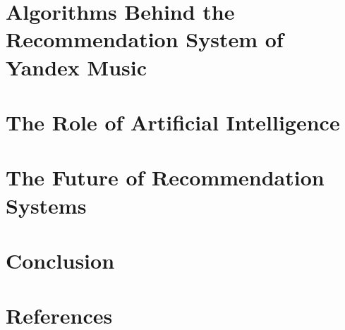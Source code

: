 \documentclass[12pt,a4paper]{article}
\begin{document}
\section{Algorithms Behind the Recommendation System of Yandex Music}

\section{The Role of Artificial Intelligence}

\section{The Future of Recommendation Systems}

\section{Conclusion}

\newpage
\section{References}



\end{document}
